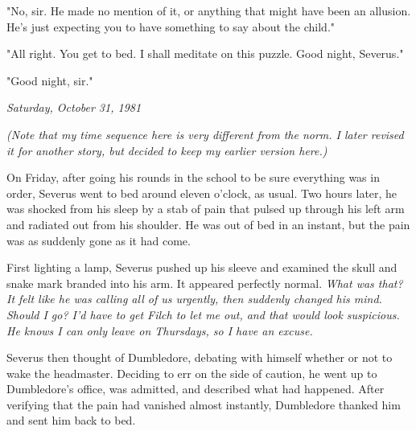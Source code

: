 \documentclass[a4paper,11pt]{article}
\begin{document}
"No, sir. He made no mention of it, or anything that might have been an allusion. He's just expecting you to have something to say about the child."

"All right. You get to bed. I shall meditate on this puzzle. Good night, Severus."

"Good night, sir."

\emph{Saturday, October 31, 1981}

\emph{(Note that my time sequence here is very different from the norm. I later revised it for another story, but decided to keep my earlier version here.)}

On Friday, after going his rounds in the school to be sure everything was in order, Severus went to bed around eleven o'clock, as usual. Two hours later, he was shocked from his sleep by a stab of pain that pulsed up through his left arm and radiated out from his shoulder. He was out of bed in an instant, but the pain was as suddenly gone as it had come.

First lighting a lamp, Severus pushed up his sleeve and examined the skull and snake mark branded into his arm. It appeared perfectly normal. \emph{What was that? It felt like he was calling all of us urgently, then suddenly changed his mind. Should I go? I'd have to get Filch to let me out, and that would look suspicious. He knows I can only leave on Thursdays, so I have an excuse.}

Severus then thought of Dumbledore, debating with himself whether or not to wake the headmaster. Deciding to err on the side of caution, he went up to Dumbledore's office, was admitted, and described what had happened. After verifying that the pain had vanished almost instantly, Dumbledore thanked him and sent him back to bed.
\end{document}
